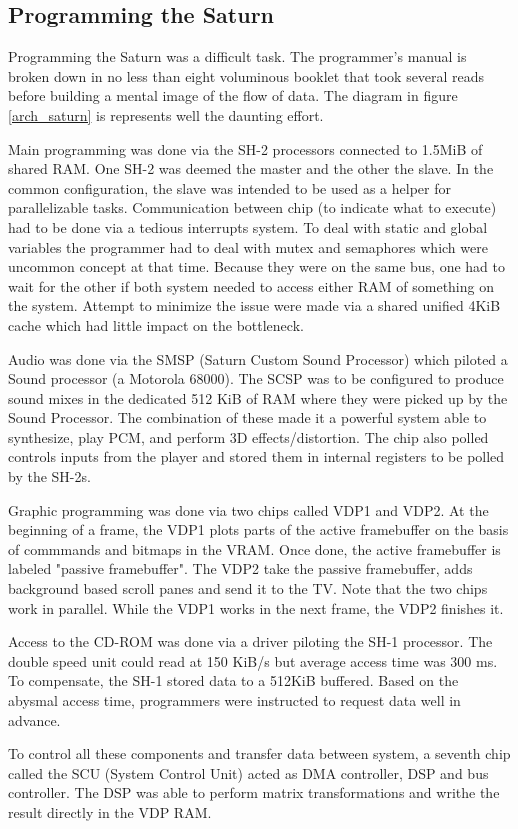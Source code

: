 \subsection{Programming the Saturn}
Programming the Saturn was a difficult task. The programmer's manual is broken down in no less than eight voluminous booklet that took several reads before building a mental image of the flow of data. The diagram in figure \ref{arch_saturn} is represents well the daunting effort.\\
\par
Main programming was done via the SH-2 processors connected to 1.5MiB of shared RAM. One SH-2 was deemed the master and the other the slave. In the common configuration, the slave was intended to be used as a helper for parallelizable tasks. Communication between chip (to indicate what to execute) had to be done via a tedious interrupts system. To deal with static and global variables the programmer had to deal with mutex and semaphores which were uncommon concept at that time. Because they were on the same bus, one had to wait for the other if both system needed to access either RAM of something on the system. Attempt to minimize the issue were made via a shared unified 4KiB cache which had little impact on the bottleneck.\\
\par
Audio was done via the SMSP (Saturn Custom Sound Processor) which piloted a Sound processor (a Motorola 68000). The SCSP was to be configured to produce sound mixes in the dedicated 512 KiB of RAM where they were picked up by the Sound Processor. The combination of these made it a powerful system able to synthesize, play PCM, and perform 3D effects/distortion. The chip also polled controls inputs from the player and stored them in internal registers to be polled by the SH-2s.\\
\par
Graphic programming was done via two chips called VDP1 and VDP2. At the beginning of a frame, the VDP1 plots parts of the active framebuffer on the basis of commmands and bitmaps in the VRAM. Once done, the active framebuffer is labeled "passive framebuffer". The VDP2 take the passive framebuffer, adds background based scroll panes and send it to the TV. Note that the two chips work in parallel. While the VDP1 works in the next frame, the VDP2 finishes it.\\
\par
Access to the CD-ROM was done via a driver piloting the SH-1 processor. The double speed unit could read at 150 KiB/s but average access time was 300 ms. To compensate, the SH-1 stored data to a 512KiB buffered. Based on the abysmal access time, programmers were instructed to request data well in advance.\\ 
\par
To control all these components and transfer data between system, a seventh chip called the SCU (System Control Unit) acted as DMA controller, DSP and bus controller. The DSP was able to perform matrix transformations and writhe the result directly in the VDP RAM.\\
\par


